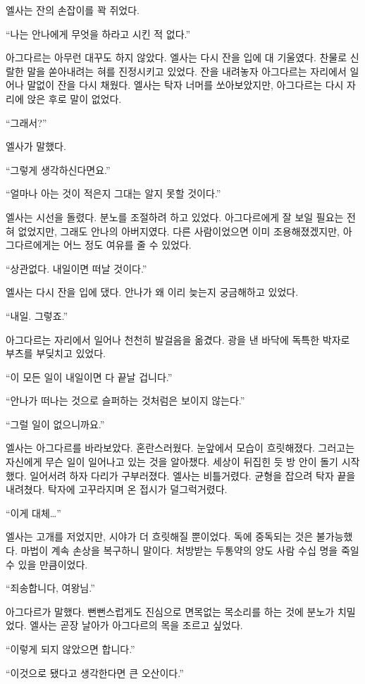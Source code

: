 엘사는 잔의 손잡이를 꽉 쥐었다.

``나는 안나에게 무엇을 하라고 시킨 적 없다.''

아그다르는 아무런 대꾸도 하지 않았다. 엘사는 다시 잔을 입에 대 기울였다. 찬물로 신랄한 말을 쏟아내려는 혀를 진정시키고 있었다. 잔을 내려놓자 아그다르는 자리에서 일어나 말없이 잔을 다시 채웠다. 엘사는 탁자 너머를 쏘아보았지만, 아그다르는 다시 자리에 앉은 후로 말이 없었다.

``그래서?''

엘사가 말했다.

``그렇게 생각하신다면요.''

``얼마나 아는 것이 적은지 그대는 알지 못할 것이다.''

엘사는 시선을 돌렸다. 분노를 조절하려 하고 있었다. 아그다르에게 잘 보일 필요는 전혀 없었지만, 그래도 안나의 아버지였다. 다른 사람이었으면 이미 조용해졌겠지만, 아그다르에게는 어느 정도 여유를 줄 수 있었다.

``상관없다. 내일이면 떠날 것이다.''

엘사는 다시 잔을 입에 댔다. 안나가 왜 이리 늦는지 궁금해하고 있었다.

``내일. 그렇죠.''

아그다르는 자리에서 일어나 천천히 발걸음을 옮겼다. 광을 낸 바닥에 독특한 박자로 부츠를 부딪치고 있었다.

``이 모든 일이 내일이면 다 끝날 겁니다.''

``안나가 떠나는 것으로 슬퍼하는 것처럼은 보이지 않는다.''

``그럴 일이 없으니까요.''

엘사는 아그다르를 바라보았다. 혼란스러웠다. 눈앞에서 모습이 흐릿해졌다. 그러고는 자신에게 무슨 일이 일어나고 있는 것을 알아챘다. 세상이 뒤집힌 듯 방 안이 돌기 시작했다. 일어서려 하자 다리가 구부러졌다. 엘사는 비틀거렸다. 균형을 잡으려 탁자 끝을 내려쳤다. 탁자에 고꾸라지며 온 접시가 덜그럭거렸다.

``이게 대체\ldots''

엘사는 고개를 저었지만, 시야가 더 흐릿해질 뿐이었다. 독에 중독되는 것은 불가능했다. 마법이 계속 손상을 복구하니 말이다. 처방받는 두통약의 양도 사람 수십 명을 죽일 수 있을 만큼이었다.

``죄송합니다, 여왕님.''

아그다르가 말했다. 뻔뻔스럽게도 진심으로 면목없는 목소리를 하는 것에 분노가 치밀었다. 엘사는 곧장 날아가 아그다르의 목을 조르고 싶었다.

``이렇게 되지 않았으면 합니다.''

``이것으로 됐다고 생각한다면 큰 오산이다.''

